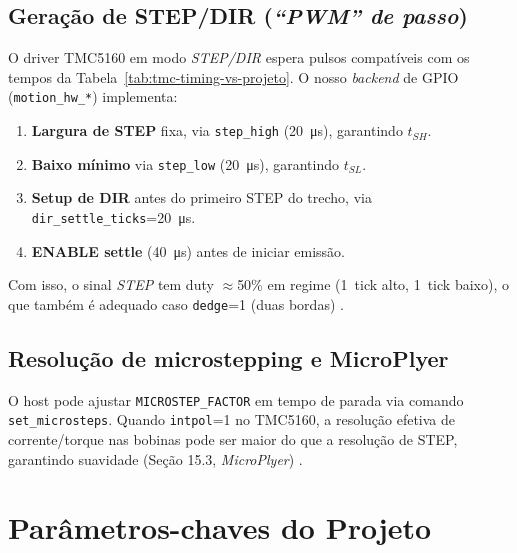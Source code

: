 \subsection{Gera\c{c}\~ao de STEP/DIR (\emph{``PWM'' de passo})}
O driver TMC5160 em modo \emph{STEP/DIR} espera pulsos compat\'iveis com os tempos da Tabela~\ref{tab:tmc-timing-vs-projeto}. O nosso \emph{backend} de GPIO (\texttt{motion\_hw\_*}) implementa:
\begin{enumerate}
  \item \textbf{Largura de STEP} fixa, via \texttt{step\_high} (\SI{20}{\micro s}), garantindo $t_{SH}$.
  \item \textbf{Baixo m\'inimo} via \texttt{step\_low} (\SI{20}{\micro s}), garantindo $t_{SL}$.
  \item \textbf{Setup de DIR} antes do primeiro STEP do trecho, via \texttt{dir\_settle\_ticks}=\SI{20}{\micro s}.
  \item \textbf{ENABLE settle} (\SI{40}{\micro s}) antes de iniciar emiss\~ao.
\end{enumerate}
Com isso, o sinal \emph{STEP} tem duty $\approx$50\% em regime (1~tick alto, 1~tick baixo), o que tamb\'em \'e adequado caso \texttt{dedge}=1 (duas bordas) \cite{tmc5160_ds}.

\subsection{Resolu\c{c}\~ao de microstepping e MicroPlyer}
O host pode ajustar \texttt{MICROSTEP\_FACTOR} em tempo de parada via comando \texttt{set\_microsteps}. Quando \texttt{intpol}=1 no TMC5160, a resolu\c{c}\~ao efetiva de corrente/torque nas bobinas pode ser maior do que a resolu\c{c}\~ao de STEP, garantindo suavidade (Se\c{c}\~ao 15.3, \emph{MicroPlyer}) \cite{tmc5160_ds}.

\FloatBarrier
\section{Par\^ametros-chaves do Projeto}
\label{sec:parametros}

